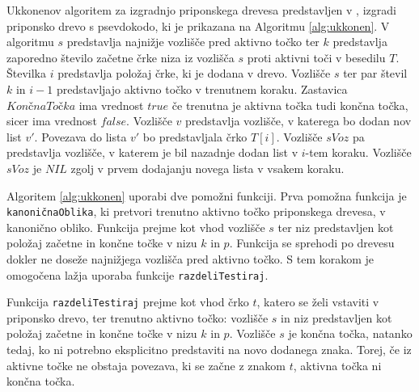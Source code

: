 Ukkonenov algoritem za izgradnjo priponskega drevesa predstavljen v \cite{Ukkonen1995}, izgradi priponsko drevo s psevdokodo, ki je prikazana na Algoritmu \ref{alg:ukkonen}.
V algoritmu $s$ predstavlja najnižje vozlišče pred aktivno točko ter $k$ predstavlja zaporedno število začetne črke niza iz vozlišča $s$ proti aktivni toči v besedilu $T$. Številka $i$ predstavlja položaj črke, ki je dodana v drevo. Vozlišče $s$ ter par števil $k$ in $i-1$ predstavljajo aktivno točko v trenutnem koraku. Zastavica $Kon\textit{č}naTo\textit{č}ka$ ima vrednost $true$ če trenutna je aktivna točka tudi končna točka, sicer ima vrednost $false$. Vozlišče $v$ predstavlja vozlišče, v katerega bo dodan nov list $v'$. Povezava do lista $v'$ bo predstavljala črko $T[i]$. Vozlišče $sVoz$ pa predstavlja vozlišče, v katerem je bil nazadnje dodan list v $i$-tem koraku. Vozlišče $sVoz$ je $NIL$ zgolj v prvem dodajanju novega lista v vsakem koraku.


Algoritem \ref{alg:ukkonen} uporabi dve pomožni funkciji. Prva pomožna funkcija je \texttt{kanoničnaOblika}, ki pretvori trenutno aktivno točko priponskega drevesa, v kanonično obliko. Funkcija prejme kot vhod vozlišče $s$ ter niz predstavljen kot položaj začetne in končne točke v nizu $k$ in $p$. Funkcija se sprehodi po drevesu dokler ne doseže najnižjega vozlišča pred aktivno točko. S tem korakom je omogočena lažja uporaba funkcije \texttt{razdeliTestiraj}.

Funkcija \texttt{razdeliTestiraj} prejme kot vhod črko $t$, katero se želi vstaviti v priponsko drevo, ter trenutno aktivno točko: vozlišče $s$ in niz predstavljen kot položaj začetne in končne točke v nizu $k$ in $p$. Vozlišče $s$ je končna točka, natanko tedaj, ko ni potrebno eksplicitno predstaviti na novo dodanega znaka. Torej, če iz aktivne točke ne obstaja povezava, ki se začne z znakom $t$, aktivna točka ni končna točka.

